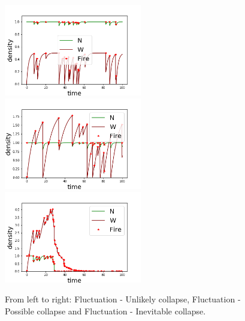 \documentclass{article}
\begin{document}
\begin{figure}[h!]
\centering
\includegraphics[width=6cm]{equivalent_low_never_2.png}
\includegraphics[width=6cm]{equivalent_low_never_3.png} \\
\includegraphics[width=6cm]{equivalent_low_between_2.png}
\caption{From left to right: Fluctuation - Unlikely collapse, Fluctuation - Possible collapse and Fluctuation - Inevitable collapse.}
\label{fig:case3fluc}
\end{figure}




\end{document}
